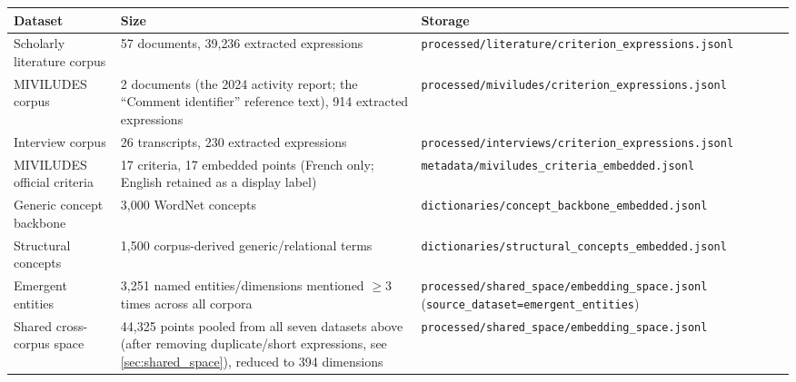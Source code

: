 \begin{center}
\begin{tabularx}{\textwidth}{@{}lXX@{}}
\toprule
Dataset & Size & Storage \\
\midrule
Scholarly literature corpus & 57 documents, 39{,}236 extracted expressions & \texttt{processed/literature/criterion\_expressions.jsonl} \\
MIVILUDES corpus & 2 documents (the 2024 activity report; the \enquote{Comment identifier} reference text), 914 extracted expressions & \texttt{processed/miviludes/criterion\_expressions.jsonl} \\
Interview corpus & 26 transcripts, 230 extracted expressions & \texttt{processed/interviews/criterion\_expressions.jsonl} \\
MIVILUDES official criteria & 17 criteria, 17 embedded points (French only; English retained as a display label) & \texttt{metadata/miviludes\_criteria\_embedded.jsonl} \\
Generic concept backbone & 3{,}000 WordNet concepts & \texttt{dictionaries/concept\_backbone\_embedded.jsonl} \\
Structural concepts & 1{,}500 corpus-derived generic/relational terms & \texttt{dictionaries/structural\_concepts\_embedded.jsonl} \\
Emergent entities & 3{,}251 named entities/dimensions mentioned $\geq$3 times across all corpora & \texttt{processed/shared\_space/embedding\_space.jsonl} (\texttt{source\_dataset=emergent\_entities}) \\
Shared cross-corpus space & 44{,}325 points pooled from all seven datasets above (after removing duplicate/short expressions, see \ref{sec:shared_space}), reduced to 394 dimensions & \texttt{processed/shared\_space/embedding\_space.jsonl} \\
\bottomrule
\end{tabularx}
\end{center}

